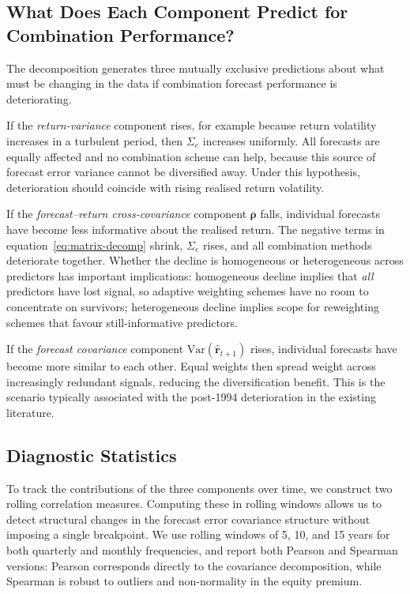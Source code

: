 \documentclass[a4paper,11pt]{article}
\begin{document}
\subsection{What Does Each Component Predict for Combination Performance?}\label{subsec:predictions}

The decomposition generates three mutually exclusive predictions about
what must be changing in the data if combination forecast performance is
deteriorating.

If the \emph{return-variance} component rises, for example because
return volatility increases in a turbulent period, then $\Sigma_e$
increases uniformly. All forecasts are equally affected and no combination
scheme can help, because this source of forecast error variance cannot be
diversified away. Under this hypothesis, deterioration should coincide
with rising realised return volatility.

If the \emph{forecast--return cross-covariance} component $\boldsymbol{\rho}$
falls, individual forecasts have become less informative about the
realised return. The negative terms in
equation~\eqref{eq:matrix-decomp} shrink, $\Sigma_e$ rises, and all
combination methods deteriorate together. Whether the decline is
homogeneous or heterogeneous across predictors has important implications:
homogeneous decline implies that \textit{all} predictors have lost signal,
so adaptive weighting schemes have no room to concentrate on survivors;
heterogeneous decline implies scope for reweighting schemes that favour
still-informative predictors.

If the \emph{forecast covariance} component
$\mathrm{Var}(\hat{\mathbf{r}}_{t+1})$ rises, individual forecasts have
become more similar to each other. Equal weights then spread weight across
increasingly redundant signals, reducing the diversification benefit. This
is the scenario typically associated with the post-1994 deterioration in
the existing literature.

\subsection{Diagnostic Statistics}\label{subsec:diagnostics}

To track the contributions of the three components over time, we construct
two rolling correlation measures. Computing these in rolling windows
allows us to detect structural changes in the forecast error covariance
structure without imposing a single breakpoint. We use rolling windows of
5, 10, and 15 years for both quarterly and monthly frequencies, and
report both Pearson and Spearman versions: Pearson corresponds directly
to the covariance decomposition, while Spearman is robust to outliers and
non-normality in the equity premium.
\end{document}
